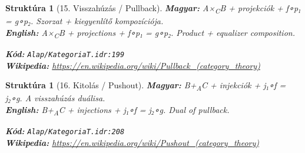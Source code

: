 \documentclass[11pt,a4paper,twocolumn]{article}
\newtheorem{struktura}[tetel]{Struktúra}
\begin{document}
\begin{struktura}[15. Visszahúzás / Pullback]

\textbf{Magyar:} A×\textsubscript{C}B + projekciók + f∘p₁ = g∘p₂. Szorzat + kiegyenlítő kompozíciója.\\

\textbf{English:} A×\textsubscript{C}B + projections + f∘p₁ = g∘p₂. Product + equalizer composition.\\

\begin{center}
\end{center}

\textbf{Kód:} \texttt{Alap/KategoriaT.idr:199}\\
\textbf{Wikipedia:} \url{https://en.wikipedia.org/wiki/Pullback_(category_theory)}

\end{struktura}

\vspace{0.5cm}

\begin{struktura}[16. Kitolás / Pushout]

\textbf{Magyar:} B+\textsubscript{A}C + injekciók + j₁∘f = j₂∘g. A visszahúzás duálisa.\\

\textbf{English:} B+\textsubscript{A}C + injections + j₁∘f = j₂∘g. Dual of pullback.\\

\begin{center}
\end{center}

\textbf{Kód:} \texttt{Alap/KategoriaT.idr:208}\\
\textbf{Wikipedia:} \url{https://en.wikipedia.org/wiki/Pushout_(category_theory)}

\end{struktura}

\vspace{0.5cm}
\end{document}
